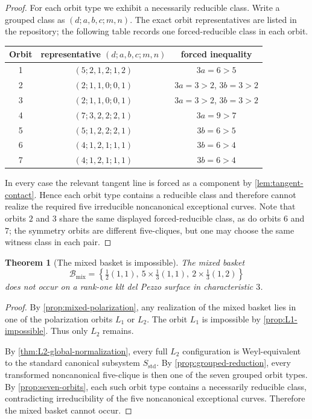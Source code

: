 \documentclass[11pt]{article}
\newtheorem{theorem}{Theorem}[section]
\theoremstyle{definition}
\begin{document}
\begin{proof}
For each orbit type we exhibit a necessarily reducible class. Write a grouped class as $(d;a,b,c;m,n)$. The exact orbit representatives are listed in the repository; the following table records one forced-reducible class in each orbit.

\begin{center}
\begin{tabular}{c|c|c}
\toprule
Orbit & representative $(d;a,b,c;m,n)$ & forced inequality \\
\midrule
1 & $(5;2,1,2;1,2)$ & $3a=6>5$ \\
2 & $(2;1,1,0;0,1)$ & $3a=3>2$, $3b=3>2$ \\
3 & $(2;1,1,0;0,1)$ & $3a=3>2$, $3b=3>2$ \\
4 & $(7;3,2,2;2,1)$ & $3a=9>7$ \\
5 & $(5;1,2,2;2,1)$ & $3b=6>5$ \\
6 & $(4;1,2,1;1,1)$ & $3b=6>4$ \\
7 & $(4;1,2,1;1,1)$ & $3b=6>4$ \\
\bottomrule
\end{tabular}
\end{center}

In every case the relevant tangent line is forced as a component by \cref{lem:tangent-contact}. Hence each orbit type contains a reducible class and therefore cannot realize the required five irreducible noncanonical exceptional curves. Note that orbits $2$ and $3$ share the same displayed forced-reducible class, as do orbits $6$ and $7$; the symmetry orbits are different five-cliques, but one may choose the same witness class in each pair.
\end{proof}

\begin{theorem}[The mixed basket is impossible]\label{thm:mixed-impossible}
The mixed basket
\[
\mathcal B_{\mathrm{mix}}=\left\{\tfrac12(1,1),\ 5\times\tfrac13(1,1),\ 2\times\tfrac13(1,2)\right\}
\]
does not occur on a rank-one klt del Pezzo surface in characteristic $3$.
\end{theorem}

\begin{proof}
By \cref{prop:mixed-polarization}, any realization of the mixed basket lies in one of the polarization orbits $L_1$ or $L_2$. The orbit $L_1$ is impossible by \cref{prop:L1-impossible}. Thus only $L_2$ remains.

By \cref{thm:L2-global-normalization}, every full $L_2$ configuration is Weyl-equivalent to the standard canonical subsystem $S_{\mathrm{std}}$. By \cref{prop:grouped-reduction}, every transformed noncanonical five-clique is then one of the seven grouped orbit types. By \cref{prop:seven-orbits}, each such orbit type contains a necessarily reducible class, contradicting irreducibility of the five noncanonical exceptional curves. Therefore the mixed basket cannot occur.
\end{proof}
\end{document}
